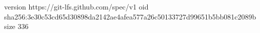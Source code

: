version https://git-lfs.github.com/spec/v1
oid sha256:3e30c53cd65d30898da2142ae4afea577a26c50133727d99651b5bb081c2089b
size 336
